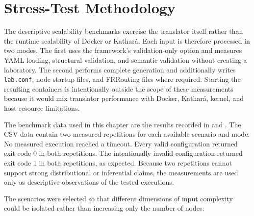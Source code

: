 \section{Stress-Test Methodology}
\label{sec:stress-methodology}

The descriptive scalability benchmarks exercise the translator itself rather
than the runtime scalability of Docker or Kathar\'a. Each input is therefore processed
in two modes. The first uses the framework's validation-only option and
measures YAML loading, structural validation, and semantic validation without
creating a laboratory. The second performs complete generation and additionally
writes \texttt{lab.conf}, node startup files, and FRRouting files where
required. Starting the resulting containers is intentionally outside the scope
of these measurements because it would mix translator performance with Docker,
Kathar\'a, kernel, and host-resource limitations.

The benchmark data used in this chapter are the results recorded in
 and . The CSV data
contain two measured repetitions for each available scenario and mode. No
measured execution reached a timeout. Every valid configuration returned exit
code 0 in both repetitions. The intentionally invalid configuration returned
exit code 1 in both repetitions, as expected. Because two repetitions cannot
support strong distributional or inferential claims, the measurements are used
only as descriptive observations of the tested executions.

The scenarios were selected so that different dimensions of input complexity
could be isolated rather than increasing only the number of nodes:

